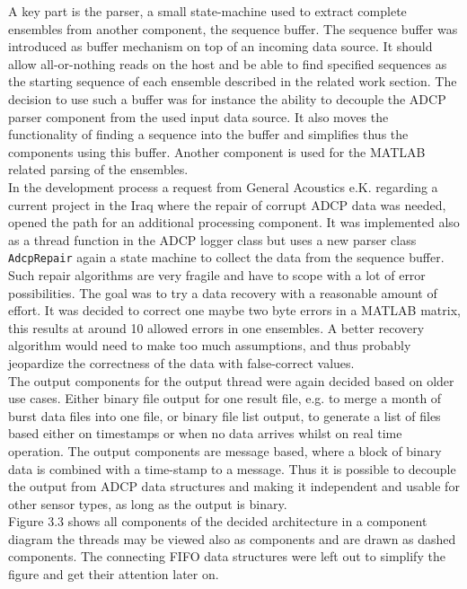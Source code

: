 A key part is the parser, a small state-machine used to extract complete ensembles from another component, the sequence buffer. The sequence buffer was introduced as buffer mechanism on top of an incoming data source. It should allow all-or-nothing reads on the host and be able to find specified sequences as the starting sequence of each ensemble described in the related work section. The decision to use such a buffer was for instance the ability to decouple the ADCP parser component from the used input data source. It also moves the functionality of finding a sequence into the buffer and simplifies thus the components using this buffer. Another component is used for the MATLAB related parsing of the ensembles.\\ In the development process a request from General Acoustics e.K. regarding a current project in the Iraq where the repair of corrupt ADCP data was needed, opened the path for an additional processing component. It was implemented also as a thread function in the ADCP logger class but uses a new parser class \texttt{AdcpRepair} again a state machine to collect the data from the sequence buffer. Such repair algorithms are very fragile and have to scope with a lot of error possibilities. The goal was to try a data recovery with a reasonable amount of effort. It was decided to correct one maybe two byte errors in a MATLAB matrix, this results at around 10 allowed errors in one ensembles. A better recovery algorithm would need to make too much assumptions, and thus probably jeopardize the correctness of the data with false-correct values.\\
The output components for the output thread were again decided based on older use cases. Either binary file output for one result file, e.g. to merge a month of burst data files into one file, or binary file list output, to generate a list of files based either on timestamps or when no data arrives whilst on real time operation. The output components are message based, where a block of binary data is combined with a time-stamp to a message. Thus it is possible to decouple the output from ADCP data structures and making it independent and usable for other sensor types, as long as the output is binary.\\
Figure 3.3 shows all components of the decided architecture in a component diagram the threads may be viewed also as components and are drawn as dashed components. The connecting FIFO data structures were left out to simplify the figure and get their attention later on.\\ 

